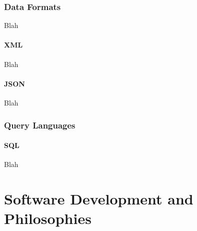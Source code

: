 \toclineskip
\section{Data Formats}

Blah


\subsection{XML}

Blah


\subsection{JSON}

Blah


\toclineskip
\section{Query Languages}


\subsection{SQL}

Blah \\

\newpage


\part*{Software Development and Philosophies}

